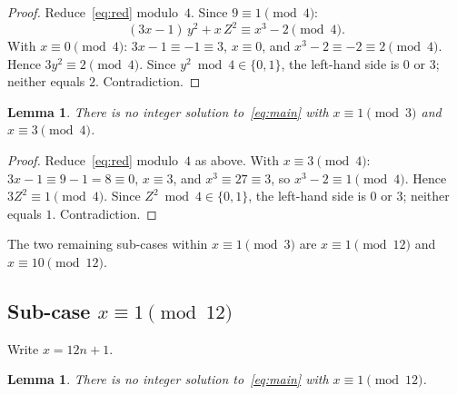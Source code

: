 \documentclass[12pt, a4paper]{amsart}
\theoremstyle{plain}
\newtheorem{lemma}[theorem]{Lemma}
\theoremstyle{definition}
\begin{document}
\begin{proof}
  Reduce~\eqref{eq:red} modulo~$4$.  Since $9 \equiv 1 \pmod{4}$:
  \[
    (3x-1)\,y^2 + x\,Z^2 \equiv x^3 - 2 \pmod{4}.
  \]
  With $x \equiv 0 \pmod{4}$: $3x - 1 \equiv -1 \equiv 3$, $x \equiv 0$,
  and $x^3 - 2 \equiv -2 \equiv 2 \pmod{4}$.  Hence
  $3y^2 \equiv 2 \pmod{4}$.
  Since $y^2 \bmod 4 \in \{0,1\}$, the left-hand side is $0$ or $3$;
  neither equals $2$.  Contradiction.
\end{proof}

\begin{lemma}\label{lem:mod4b}
  There is no integer solution to~\eqref{eq:main} with $x \equiv 1 \pmod{3}$
  and $x \equiv 3 \pmod{4}$.
\end{lemma}

\begin{proof}
  Reduce~\eqref{eq:red} modulo~$4$ as above.
  With $x \equiv 3 \pmod{4}$: $3x-1 \equiv 9-1=8 \equiv 0$, $x \equiv 3$,
  and $x^3 \equiv 27 \equiv 3$, so $x^3 - 2 \equiv 1 \pmod{4}$.  Hence
  $3Z^2 \equiv 1 \pmod{4}$.
  Since $Z^2 \bmod 4 \in \{0,1\}$, the left-hand side is $0$ or $3$;
  neither equals $1$.  Contradiction.
\end{proof}

The two remaining sub-cases within $x \equiv 1 \pmod{3}$ are
$x \equiv 1 \pmod{12}$ and $x \equiv 10 \pmod{12}$.

\subsection{Sub-case \texorpdfstring{$x \equiv 1 \pmod{12}$}{x ≡ 1 (mod 12)}}

Write $x = 12n + 1$.

\begin{lemma}\label{lem:case1e}
  There is no integer solution to~\eqref{eq:main} with $x \equiv 1 \pmod{12}$.
\end{lemma}
\end{document}
